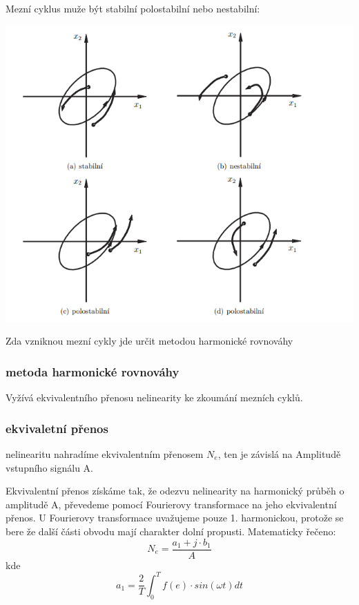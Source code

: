 Mezní cyklus muže být stabilní polostabilní nebo nestabilní:  

\includegraphics{img/mez_cykly.png}

Zda vzniknou mezní cykly jde určit metodou harmonické rovnováhy
\subsubsection*{metoda harmonické rovnováhy}
Vyžívá ekvivalentního přenosu nelinearity ke zkoumání mezních cyklů.

\subsubsection*{ekvivaletní přenos}
nelinearitu nahradíme ekvivalentním přenosem $N_e$, ten je závislá na Amplitudě vstupního signálu A.

Ekvivalentní přenos získáme  tak, že odezvu nelinearity na harmonický průběh o amplitudě A, převedeme pomocí Fourierovy transformace na jeho ekvivalentní přenos. U Fourierovy transformace uvažujeme pouze 1. harmonickou, 
protože se bere že další části obvodu mají charakter dolní propusti. Matematicky řečeno:
\begin{equation*}
    N_e= \frac{a_1+j\cdot b_1}{A}
\end{equation*}
kde
\begin{equation*}
    a_1=\frac{2}{T} \int_{0}^{T} f(e) \cdot sin(\omega t) dt
\end{equation*}

